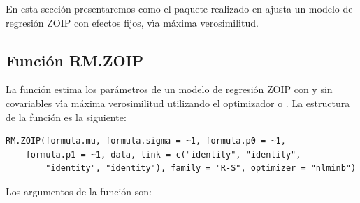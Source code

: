 En esta secci\'{o}n presentaremos como el paquete  realizado en  ajusta un modelo de regresi\'{o}n ZOIP con efectos fijos, v\'{\i}a m\'{a}xima verosimilitud.

%
%

\subsection{Funci\'{o}n RM.ZOIP}

La funci\'{o}n  estima los par\'{a}metros de un modelo de regresi\'{o}n ZOIP con y sin covariables v\'{\i}a m\'{a}xima verosimilitud utilizando el optimizador  o . La estructura de la funci\'{o}n  es la siguiente:

\begin{verbatim}
RM.ZOIP(formula.mu, formula.sigma = ~1, formula.p0 = ~1, 
    formula.p1 = ~1, data, link = c("identity", "identity", 
        "identity", "identity"), family = "R-S", optimizer = "nlminb")
\end{verbatim}

Los argumentos de la funci\'{o}n  son:

